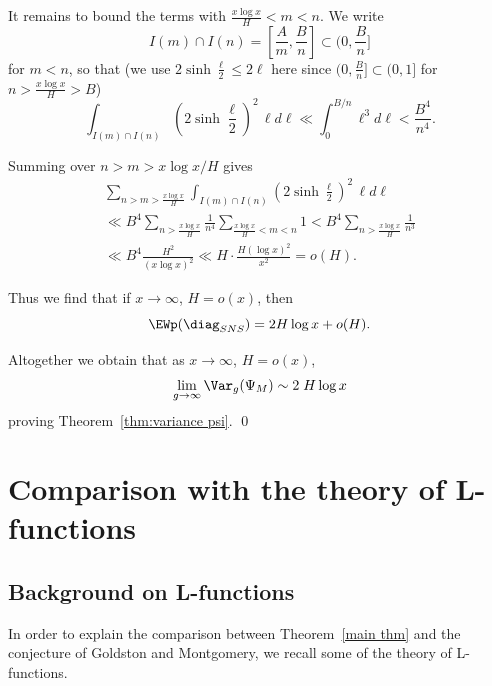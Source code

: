 \documentclass[12pt]{amsart}
\begin{document}
It remains to bound the terms with $\frac{x\log x}H<m<n$.  
We write 
$$I(m)\cap I(n) = [\frac Am, \frac Bn]\subset (0, \frac Bn]$$
 for $m<n$, so that (we use $2\sinh \frac \ell 2\leq 2\ell$ here since $(0,\frac Bn]\subset (0,1]$ for $n>\frac{x\log x}{H}>B$)
\[
\int_{I(m)\cap I(n)} \left( 2\sinh \frac \ell 2 \right)^2 \,\ell d\ell \ll \int_0^{B/n} \ell^3 d\ell   <\frac{B^4}{ n^4}.
\] 

Summing over $n>m>x\log x/H$  gives 
\begin{multline*}
\sum_{n>m>\frac{x\log x}H} \int_{I(m)\cap I(n)} \left( 2\sinh \frac \ell 2 \right)^2 \,\ell d\ell 
\\
\ll
B^4 \sum_{n>\frac{x\log x}H} \frac 1{n^4} \sum_{\frac{x\log x}H<m<n} 1
 < B^4 \sum_{n>\frac{x\log x}H} \frac 1{n^3} 
\\
\ll B^4 \frac{H^2}{(x\log x)^2} \ll H \cdot \frac{ H(\log x)^2}{x^2} = o(H). 
\end{multline*}

 

 

Thus we find that if $x\to \infty$, $H=o(x)$, then
\begin{equation*}%
\EWp(\diag_{SNS})
   = 2H \log x  +o(H)  .
\end{equation*}
 
 Altogether we obtain that as $x\to \infty$, $H=o(x)$, 
\[
\lim_{g\to \infty} \Var_g(\Psi_M) \sim 2 \; H \log x  
\]
proving Theorem~\ref{thm:variance psi}. \qed
 








\section{Comparison with the theory of L-functions}

\subsection{Background on L-functions}\label{sec:L-functions}

In order to explain the comparison between Theorem~\ref{main thm} and the conjecture of Goldston and Montgomery, we recall some of the theory of L-functions.
\end{document}
